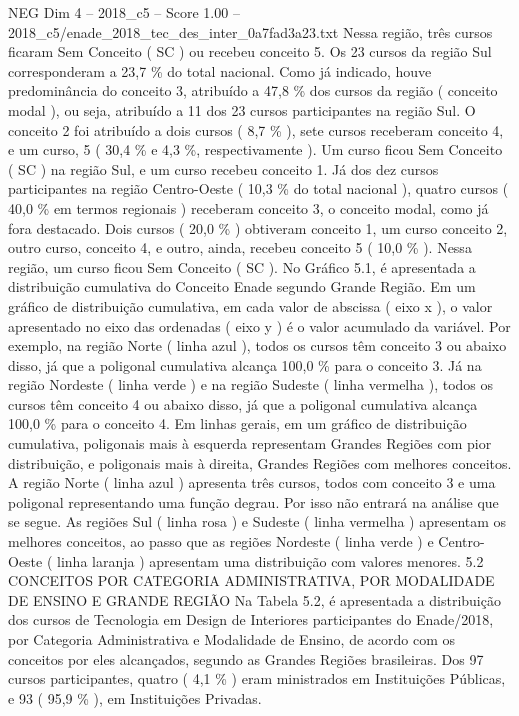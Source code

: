 \begin{textsample}{NEG Dim 4 – 2018\_c5 – Score 1.00 – 2018\_c5/enade\_2018\_tec\_des\_inter\_0a7fad3a23.txt}
Nessa região, três cursos ficaram Sem Conceito ( SC ) ou recebeu conceito 5.
Os 23 cursos da região Sul corresponderam a 23,7 \% do total nacional.
Como já indicado, houve predominância do conceito 3, atribuído a 47,8 \% dos cursos da região ( conceito modal ), ou seja, atribuído a 11 dos 23 cursos participantes na região Sul.
O conceito 2 foi atribuído a dois cursos ( 8,7 \% ), sete cursos receberam conceito 4, e um curso, 5 ( 30,4 \% e 4,3 \%, respectivamente ).
Um curso ficou Sem Conceito ( SC ) na região Sul, e um curso recebeu conceito 1.
Já dos dez cursos participantes na região Centro-Oeste ( 10,3 \% do total nacional ), quatro cursos ( 40,0 \% em termos regionais ) receberam conceito 3, o conceito modal, como já fora destacado.
Dois cursos ( 20,0 \% ) obtiveram conceito 1, um curso conceito 2, outro curso, conceito 4, e outro, ainda, recebeu conceito 5 ( 10,0 \% ).
Nessa região, um curso ficou Sem Conceito ( SC ).
No Gráfico 5.1, é apresentada a distribuição cumulativa do Conceito Enade segundo Grande Região.
Em um gráfico de distribuição cumulativa, em cada valor de abscissa ( eixo x ), o valor apresentado no eixo das ordenadas ( eixo y ) é o valor acumulado da variável.
Por exemplo, na região Norte ( linha azul ), todos os cursos têm conceito 3 ou abaixo disso, já que a poligonal cumulativa alcança 100,0 \% para o conceito 3.
Já na região Nordeste ( linha verde ) e na região Sudeste ( linha vermelha ), todos os cursos têm conceito 4 ou abaixo disso, já que a poligonal cumulativa alcança 100,0 \% para o conceito 4.
Em linhas gerais, em um gráfico de distribuição cumulativa, poligonais mais à esquerda representam Grandes Regiões com pior distribuição, e poligonais mais à direita, Grandes Regiões com melhores conceitos.
A região Norte ( linha azul ) apresenta três cursos, todos com conceito 3 e uma poligonal representando uma função degrau.
Por isso não entrará na análise que se segue.
As regiões Sul ( linha rosa ) e Sudeste ( linha vermelha ) apresentam os melhores conceitos, ao passo que as regiões Nordeste ( linha verde ) e Centro-Oeste ( linha laranja ) apresentam uma distribuição com valores menores. 5.2 CONCEITOS POR CATEGORIA ADMINISTRATIVA, POR MODALIDADE DE ENSINO E GRANDE REGIÃO Na Tabela 5.2, é apresentada a distribuição dos cursos de Tecnologia em Design de Interiores participantes do Enade/2018, por Categoria Administrativa e Modalidade de Ensino, de acordo com os conceitos por eles alcançados, segundo as Grandes Regiões brasileiras.
Dos 97 cursos participantes, quatro ( 4,1 \% ) eram ministrados em Instituições Públicas, e 93 ( 95,9 \% ), em Instituições Privadas.

\end{textsample}
